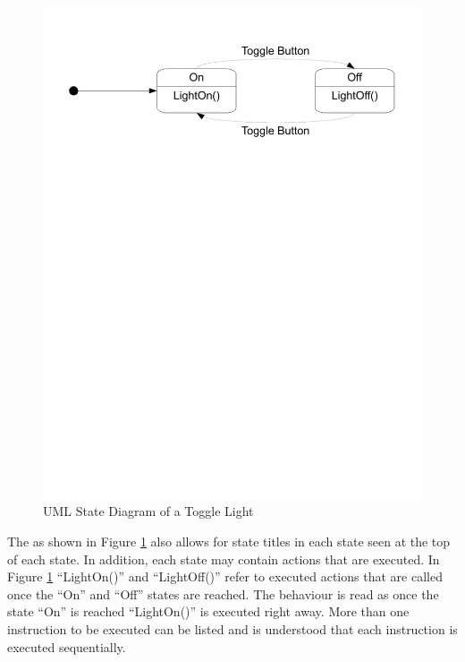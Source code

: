 \begin{figure}[htp]
    \centering
    \includegraphics[trim= 15mm 200mm 15mm 10mm, clip, width=\imgmedium]{./images/state_uml_light.pdf} 
    \caption{UML State Diagram of a Toggle Light}
    \label{fig:state_uml_light}
\end{figure}

The \cite{UML2} as shown in Figure \ref{fig:state_uml_light} also allows for state titles in each state seen at the top of each state. In addition, each state may contain actions that are executed. In Figure \ref{fig:state_uml_light} ``LightOn()'' and ``LightOff()'' refer to executed actions that are called once the ``On'' and ``Off'' states are reached. The behaviour is read as once the state ``On'' is reached ``LightOn()'' is executed right away. More than one instruction to be executed can be listed and is understood that each instruction is executed sequentially\cite{UML2}.

